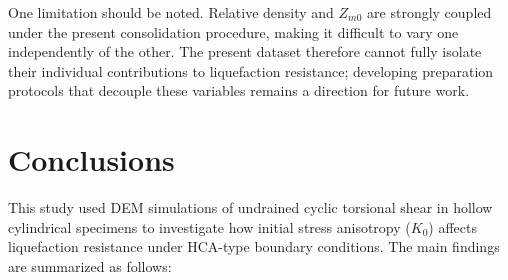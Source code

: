\documentclass[a4paper,fleqn]{cas-sc}
\newcommand{\Kzero}{\ensuremath{K_0}}
\begin{document}
One limitation should be noted. Relative density and $Z_{m0}$ are strongly coupled under the present consolidation procedure, making it difficult to vary one independently of the other. The present dataset therefore cannot fully isolate their individual contributions to liquefaction resistance; developing preparation protocols that decouple these variables remains a direction for future work.
 \section{Conclusions}
\label{sec:conclusions}

This study used DEM simulations of undrained cyclic torsional shear in hollow cylindrical specimens to investigate how initial stress anisotropy (\Kzero{}) affects liquefaction resistance under HCA-type boundary conditions. The main findings are summarized as follows:
\end{document}
